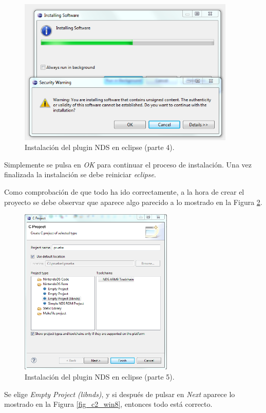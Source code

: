 \begin{figure}[t]
\centering
\includegraphics[height=7cm]{./Figuras/C2/c2_instalar_windows6.png}
\caption{Instalación del plugin NDS en eclipse (parte 4).}
\label{fig_c2_win6}
\end{figure}

Simplemente se pulsa en \textit{OK} para continuar el proceso de instalación. Una vez finalizada la instalación se debe reiniciar \textit{eclipse}.

Como comprobación de que todo ha ido correctamente, a la hora de crear el proyecto se debe observar que aparece algo parecido a lo mostrado en la Figura \ref{fig_c2_win7}.

\begin{figure}[h]
\centering
\includegraphics[height=8cm]{./Figuras/C2/c2_instalar_windows7.png}
\caption{Instalación del plugin NDS en eclipse (parte 5).}
\label{fig_c2_win7}
\end{figure}


Se elige \textit{Empty Project (libnds)}, y si después de pulsar en \textit{Next} aparece lo mostrado en la Figura \ref{fig_c2_win8}, entonces todo está correcto.

